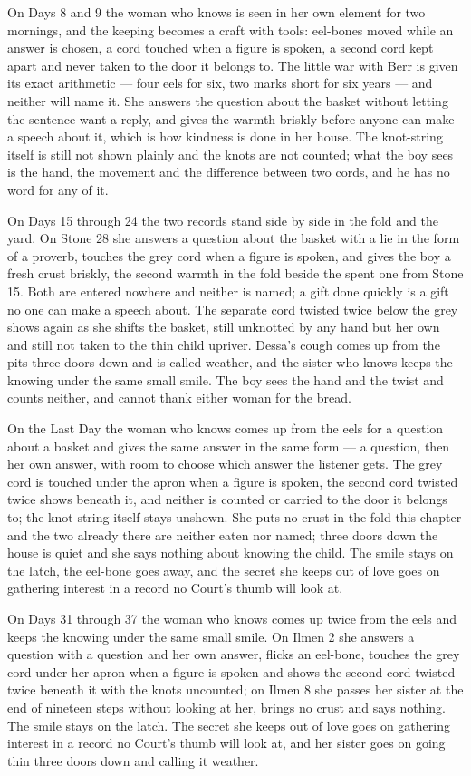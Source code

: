 \documentclass{design/chronicle}
\begin{document}
{On Days 8 and 9 the woman who knows is seen in her own element for two mornings, and the keeping becomes a craft with tools: eel-bones moved while an answer is chosen, a cord touched when a figure is spoken, a second cord kept apart and never taken to the door it belongs to. The little war with Berr is given its exact arithmetic --- four eels for six, two marks short for six years --- and neither will name it. She answers the question about the basket without letting the sentence want a reply, and gives the warmth briskly before anyone can make a speech about it, which is how kindness is done in her house. The knot-string itself is still not shown plainly and the knots are not counted; what the boy sees is the hand, the movement and the difference between two cords, and he has no word for any of it.

On Days 15 through 24 the two records stand side by side in the fold and the yard. On Stone 28 she answers a question about the basket with a lie in the form of a proverb, touches the grey cord when a figure is spoken, and gives the boy a fresh crust briskly, the second warmth in the fold beside the spent one from Stone 15. Both are entered nowhere and neither is named; a gift done quickly is a gift no one can make a speech about. The separate cord twisted twice below the grey shows again as she shifts the basket, still unknotted by any hand but her own and still not taken to the thin child upriver. Dessa’s cough comes up from the pits three doors down and is called weather, and the sister who knows keeps the knowing under the same small smile. The boy sees the hand and the twist and counts neither, and cannot thank either woman for the bread.

On the Last Day the woman who knows comes up from the eels for a question about a basket and gives the same answer in the same form --- a question, then her own answer, with room to choose which answer the listener gets. The grey cord is touched under the apron when a figure is spoken, the second cord twisted twice shows beneath it, and neither is counted or carried to the door it belongs to; the knot-string itself stays unshown. She puts no crust in the fold this chapter and the two already there are neither eaten nor named; three doors down the house is quiet and she says nothing about knowing the child. The smile stays on the latch, the eel-bone goes away, and the secret she keeps out of love goes on gathering interest in a record no Court’s thumb will look at.

On Days 31 through 37 the woman who knows comes up twice from the eels and keeps the knowing under the same small smile. On Ilmen 2 she answers a question with a question and her own answer, flicks an eel-bone, touches the grey cord under her apron when a figure is spoken and shows the second cord twisted twice beneath it with the knots uncounted; on Ilmen 8 she passes her sister at the end of nineteen steps without looking at her, brings no crust and says nothing. The smile stays on the latch. The secret she keeps out of love goes on gathering interest in a record no Court’s thumb will look at, and her sister goes on going thin three doors down and calling it weather.

}
\end{document}
